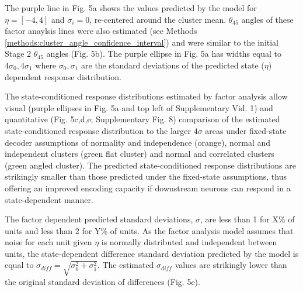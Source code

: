 \documentclass{article}
\begin{document}
The purple line in Fig. 5a shows the values predicted by the model for $\eta = [-4, 4]$ and $\sigma_i = 0$, re-centered around the cluster mean. $\theta_{45}$ angles of these factor anaylsis lines were also estimated 
(see Methods \ref{methods:cluster_angle_confidence_interval}) and were similar to the initial Stage 2 $\theta_{45}$ angles (Fig. 5b). The purple ellipse in Fig. 5a has widths equal to $4\sigma_0, 4\sigma_1$ where  $\sigma_0, \sigma_1$ are the standard deviations of the predicted state ($\eta$) dependent response distribution. 

The state-conditioned response distributions estimated by factor analysis allow visual (purple ellipses in Fig. 5a and top left of Supplementary Vid. 1) and quantitative (Fig. 5c,d,e; Supplementary Fig. 8) comparison of the estimated state-conditioned response distribution to the larger $4\sigma$ areas under fixed-state decoder assumptions of normality and independence (orange), normal and independent clusters (green flat cluster) and normal and correlated clusters (green angled cluster). The predicted state-conditioned response distributions are strikingly smaller than those predicted under the fixed-state assumptions, thus offering an improved encoding capacity if downstream neurons can respond in a state-dependent manner. 

The factor dependent predicted standard deviations, $\sigma$, are less than 1 for X\% of units and less than 2 for Y\% of units. 
As the factor analysis model assumes that noise for each unit given $\eta$ is normally distributed and independent between units, the state-dependent difference standard deviation predicted by the model is equal to \(\sigma_{diff} = \sqrt{\sigma_{0}^2 + \sigma_{1}^2}\). The estimated $\sigma_{diff}$ values are strikingly lower than the original standard deviation of differences (Fig. 5e). 

\end{document}
